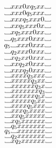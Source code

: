 \documentclass[12pt]{article}
\newcommand\Vtextvisiblespace[1][.8em]{%
	\mbox{\kern.07em\vrule height.3ex}%
	\vbox{\hrule width#1}%
	\hbox{\vrule height.3ex}}
\begin{document}
$\Vtextvisiblespace xxx0x     q_5 xx      \Vtextvisiblespace  $  \\
$\Vtextvisiblespace xxx0      q_5 xxx     \Vtextvisiblespace  $  \\
$\Vtextvisiblespace xxx       q_5 xxx0    \Vtextvisiblespace  $  \\
$\Vtextvisiblespace xx        q_5 xxx0x   \Vtextvisiblespace  $  \\
$\Vtextvisiblespace x         q_5 xxx0xx  \Vtextvisiblespace  $  \\
$\Vtextvisiblespace           q_5 xxx0xxx \Vtextvisiblespace  $  \\
$q_5 \Vtextvisiblespace           xxx0xxx \Vtextvisiblespace  $  \\
$\Vtextvisiblespace           q_2 xxx0xxx \Vtextvisiblespace  $  \\
$\Vtextvisiblespace x         q_2 xx0xxx  \Vtextvisiblespace  $  \\
$\Vtextvisiblespace xx        q_2 x0xxx   \Vtextvisiblespace  $  \\
$\Vtextvisiblespace xxx       q_2 0xxx    \Vtextvisiblespace  $  \\
$\Vtextvisiblespace xxxx      q_3 xxx     \Vtextvisiblespace  $  \\
$\Vtextvisiblespace xxxxx     q_3 xx      \Vtextvisiblespace  $  \\
$\Vtextvisiblespace xxxxxx    q_3 x       \Vtextvisiblespace  $  \\
$\Vtextvisiblespace xxxxxxx   q_3         \Vtextvisiblespace  $  \\
$\Vtextvisiblespace xxxxxx    q_5 x       \Vtextvisiblespace  $  \\
$\Vtextvisiblespace xxxxx     q_5 xx      \Vtextvisiblespace  $  \\
$\Vtextvisiblespace xxxx      q_5 xxx     \Vtextvisiblespace  $  \\
$\Vtextvisiblespace xxx       q_5 xxxx    \Vtextvisiblespace  $  \\
$\Vtextvisiblespace xx        q_5 xxxxx   \Vtextvisiblespace  $  \\
$\Vtextvisiblespace x         q_5 xxxxxx  \Vtextvisiblespace  $  \\
$\Vtextvisiblespace           q_5 xxxxxxx \Vtextvisiblespace  $  \\
$q_5 \Vtextvisiblespace           xxxxxxx \Vtextvisiblespace  $  \\
$\Vtextvisiblespace           q_2 xxxxxxx \Vtextvisiblespace  $  \\
$\Vtextvisiblespace x         q_2 xxxxxx  \Vtextvisiblespace  $  \\
\end{document}
